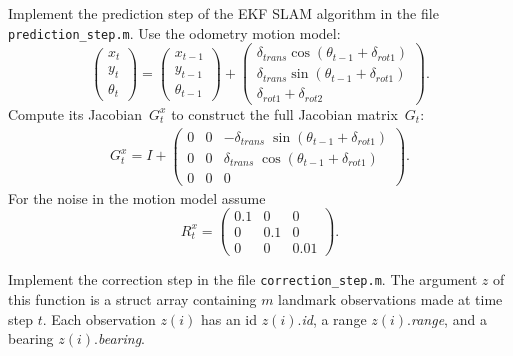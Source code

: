 \documentclass[12pt,a4paper]{article}
\begin{document}
\begin{enumialpha}
    \item
      Implement the prediction step of the EKF SLAM algorithm in the
      file\\ \texttt{prediction\_step.m}. Use the odometry motion
      model:
      \begin{equation*}
        \left(\begin{array}{c} x_t \\ y_t \\ \theta_t \end{array}\right) = \left(\begin{array}{c} x_{t-1} \\ y_{t-1} \\ \theta_{t-1} \end{array}\right) + \left(\begin{array}{c} \delta_{trans} \cos(\theta_{t-1} + \delta_{rot1}) \\ \delta_{trans} \sin(\theta_{t-1} + \delta_{rot1}) \\ \delta_{rot1} + \delta_{rot2} \end{array}\right).
      \end{equation*}
      Compute its Jacobian~$G^x_t$ to construct the full Jacobian
      matrix~$G_t$:
      \begin{align*}
        G^x_t = I + 
        \begin{pmatrix}
          0 & 0 & -\delta_{trans} \; \sin(\theta_{t-1}+\delta_{rot1})\\
          0 & 0 & \delta_{trans} \; \cos(\theta_{t-1}+\delta_{rot1})\\
          0 & 0 & 0
        \end{pmatrix}.
      \end{align*}
      For the noise in the motion model assume
      \begin{equation*}
        R^x_t = \left(\begin{array}{ccc} 0.1 & 0 & 0 \\ 0 & 0.1 & 0 \\ 0 & 0 & 0.01 \end{array}\right).
        \end{equation*}
    \item
      Implement the correction step in the file
      \texttt{correction\_step.m}. The argument $z$ of this function is
      a struct array containing $m$ landmark observations made at time
      step $t$. Each observation $z(i)$ has an id $z(i)$.\emph{id}, a
      range $z(i)$.\emph{range}, and a bearing $z(i)$.\emph{bearing}.


\end{enumialpha}
\end{document}
